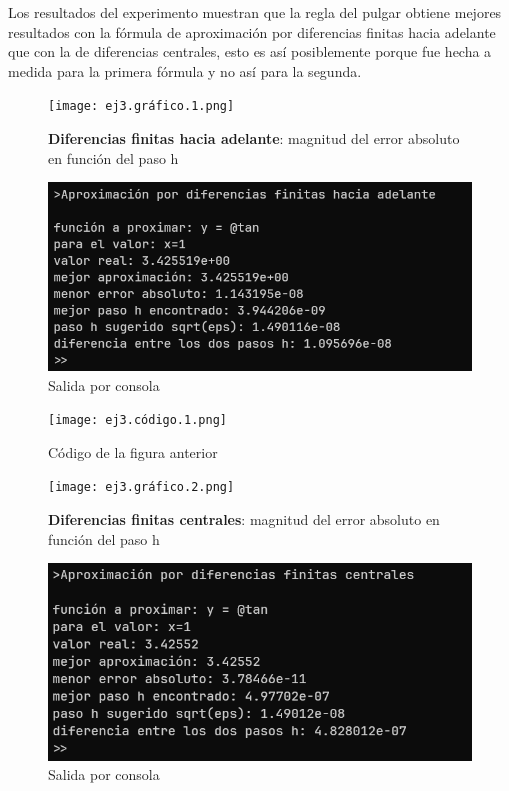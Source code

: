 \documentclass{article}
\begin{document}
Los resultados del experimento muestran que la regla del pulgar obtiene mejores resultados con la fórmula de aproximación por diferencias finitas hacia adelante que con la de diferencias centrales, esto es así posiblemente porque fue hecha a medida para la primera fórmula y no así para la segunda.
	
\begin{figure}[H]
    \centering
    \texttt{[image: ej3.gráfico.1.png]}
    \caption{\textbf{Diferencias finitas hacia adelante}:  magnitud del error absoluto en función del paso h}
    \label{fig:enter-label}
\end{figure}

\begin{figure}[H]
    \centering
    \includegraphics[width=1\linewidth]{ej3.resultados.1.png}
    \caption{Salida por consola}
    \label{fig:enter-label}
\end{figure}

\begin{figure}[H]
    \centering
    \texttt{[image: ej3.código.1.png]}
    \caption{Código de la figura anterior}
    \label{fig:enter-label}
\end{figure}

\begin{figure}[H]
    \centering
    \texttt{[image: ej3.gráfico.2.png]}
    \caption{\textbf{Diferencias finitas centrales}:  magnitud del error absoluto en función del paso h}
    \label{fig:enter-label}
\end{figure}

\begin{figure}[H]
    \centering
    \includegraphics[width=1\linewidth]{ej3.resultados.2.png}
    \caption{Salida por consola}
    \label{fig:enter-label}
\end{figure}
\end{document}

